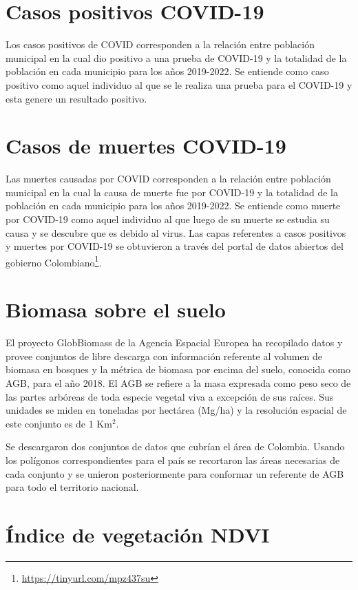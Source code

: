 \section{Casos positivos COVID-19}

Los casos positivos de COVID corresponden a la relación entre población municipal en la cual dio positivo a una prueba de COVID-19 y la totalidad de la 
población en cada municipio para los años 2019-2022. Se entiende como caso positivo como aquel individuo al que se le realiza una prueba para el COVID-19 y esta 
genere un resultado positivo.

\section{Casos de muertes COVID-19}

Las muertes causadas por COVID corresponden a la relación entre población municipal en la cual la causa de muerte fue por COVID-19 y la totalidad de la
población en cada municipio para los años 2019-2022.  Se entiende como muerte por COVID-19 como aquel individuo al que luego de su muerte se estudia su causa y 
se descubre que es debido al virus.  Las capas referentes a casos positivos y muertes por COVID-19 se obtuvieron a través del portal de datos abiertos del 
gobierno Colombiano\footnote{\url{https://tinyurl.com/mpz437su}}.

\section{Biomasa sobre el suelo}

El proyecto GlobBiomass \cite{santoro_globbiomass_2018, santoro_detailed_2018} de la Agencia Espacial Europea ha recopilado datos y provee conjuntos de libre 
descarga con información referente al volumen de biomasa en bosques y la métrica de biomasa por encima del suelo, conocida como AGB, para el año 2018.  El AGB 
se refiere a la masa expresada como peso seco de las partes arbóreas de toda especie vegetal viva a excepción de sus raíces.  Sus unidades se miden en toneladas 
por hectárea (Mg/ha) y la resolución espacial de este conjunto es de 1 Km$^2$.

Se descargaron dos conjuntos de datos que cubrían el área de Colombia.  Usando los polígonos correspondientes para el país se recortaron las áreas necesarias de 
cada conjunto y se unieron posteriormente para conformar un referente de AGB para todo el territorio nacional.

\section{Índice de vegetación NDVI}

